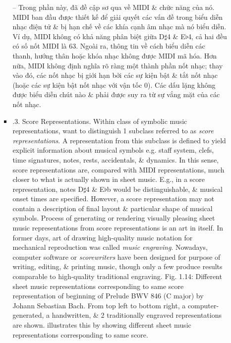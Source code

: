 \documentclass{article}
\begin{document}
\begin{itemize}
\begin{itemize}
\begin{itemize}
			-- Trong phần này, đã đề cập sơ qua về MIDI \& chức năng của nó. MIDI ban đầu được thiết kế để giải quyết các vấn đề trong biểu diễn nhạc điện tử \& bị hạn chế về các khía cạnh âm nhạc mà nó biểu diễn. Ví dụ, MIDI không có khả năng phân biệt giữa D$\sharp$4 \& E$\flat$4, cả hai đều có số nốt MIDI là 63. Ngoài ra, thông tin về cách biểu diễn các thanh, hướng thân hoặc khóa nhạc không được MIDI mã hóa. Hơn nữa, MIDI không định nghĩa rõ ràng một thành phần nốt nhạc; thay vào đó, các nốt nhạc bị giới hạn bởi các sự kiện bật \& tắt nốt nhạc (hoặc các sự kiện bật nốt nhạc với vận tốc 0). Các dấu lặng không được biểu diễn chút nào \& phải được suy ra từ sự vắng mặt của các nốt nhạc.
			\item {.3. Score Representations.} Within class of symbolic music representations, want to distinguish 1 subclass referred to as {\it score representations}. A representation from this subclass is defined to yield explicit information about musical symbols e.g. staff system, clefs, time signatures, notes, rests, accidentals, \& dynamics. In this sense, score representations are, compared with MIDI representations, much closer to what is actually shown in sheet music. E.g., in a score representation, notes D$\sharp$4 \& E$\flat$b would be distinguishable, \& musical onset times are specified. However, a score representation may not contain a description of final layout \& particular shape of musical symbols. Process of generating or rendering visually pleasing sheet music representations from score representations is an art in itself. In former days, art of drawing high-quality music notation for mechanical reproduction was called {\it music engraving}. Nowadays, computer software or {\it scorewriters} have been designed for purpose of writing, editing, \& printing music, though only a few produce results comparable to high-quality traditional engraving. {\sf Fig. 1.14: Different sheet music representations corresponding to same score representation of beginning of Prelude BWV 846 (C major) by {\sc Johann Sebastian Bach}. From top left to bottom right, a computer-generated, a handwritten, \& 2 traditionally engraved representations are shown.} illustrates this by showing different sheet music representations corresponding to same score.
			

\end{itemize}
\end{itemize}
\end{itemize}
\end{document}
